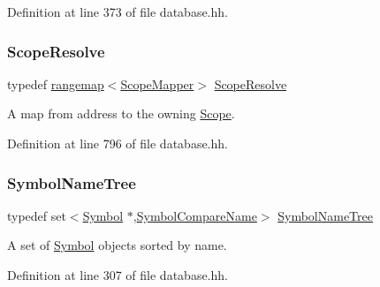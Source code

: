 Definition at line 373 of file database.\+hh.

\mbox{\label{database_8hh_ada192c66697381e90aa3ab34196f9ad7}} 
\subsubsection{\texorpdfstring{ScopeResolve}{ScopeResolve}}
{\footnotesize\ttfamily typedef \mbox{\hyperlink{classrangemap}{rangemap}}$<$\mbox{\hyperlink{class_scope_mapper}{Scope\+Mapper}}$>$ \mbox{\hyperlink{database_8hh_ada192c66697381e90aa3ab34196f9ad7}{Scope\+Resolve}}}



A map from address to the owning \mbox{\hyperlink{class_scope}{Scope}}. 



Definition at line 796 of file database.\+hh.

\mbox{\label{database_8hh_a6ed1db9b39a7f86a7a00b392bbe3f0d1}} 
\subsubsection{\texorpdfstring{SymbolNameTree}{SymbolNameTree}}
{\footnotesize\ttfamily typedef set$<$\mbox{\hyperlink{class_symbol}{Symbol}} $\ast$,\mbox{\hyperlink{class_symbol_compare_name}{Symbol\+Compare\+Name}}$>$ \mbox{\hyperlink{database_8hh_a6ed1db9b39a7f86a7a00b392bbe3f0d1}{Symbol\+Name\+Tree}}}



A set of \mbox{\hyperlink{class_symbol}{Symbol}} objects sorted by name. 



Definition at line 307 of file database.\+hh.

